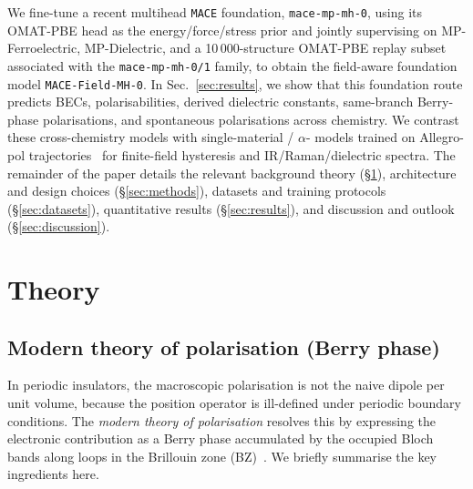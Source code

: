 \documentclass[aps,physrev,graphicx,amsmath,amssymb,
               reprint,superscriptaddress]{revtex4-2}
\begin{document}
We fine-tune a recent multihead \texttt{MACE} foundation, \texttt{mace-mp-mh-0}, using its OMAT-PBE head as the energy/force/stress prior and jointly supervising on MP-Ferroelectric, MP-Dielectric, and a 10\,000-structure OMAT-PBE replay subset associated with the \texttt{mace-mp-mh-0/1} family, to obtain the field-aware foundation model \texttt{MACE-Field-MH-0}. In Sec.~\ref{sec:results}, we show that this foundation route predicts BECs, polarisabilities, derived dielectric constants, same-branch Berry-phase polarisations, and spontaneous polarisations across chemistry. We contrast these cross-chemistry models with single-material  / $\alpha$- models trained on Allegro-pol trajectories~\cite{allegro-pol-2025} for finite-field hysteresis and IR/Raman/dielectric spectra. The remainder of the paper details the relevant background theory (\S\ref{sec:theory}), architecture and design choices (\S\ref{sec:methods}), datasets and training protocols (\S\ref{sec:datasets}), quantitative results (\S\ref{sec:results}), and discussion and outlook (\S\ref{sec:discussion}).


\section{Theory}\label{sec:theory}

\subsection{Modern theory of polarisation (Berry phase)}

In periodic insulators, the macroscopic polarisation is not the naive dipole per unit volume, because the position operator is ill-defined under periodic boundary conditions. The \emph{modern theory of polarisation} resolves this by expressing the electronic contribution as a Berry phase accumulated by the occupied Bloch bands along loops in the Brillouin zone (BZ)~\cite{king-smith-vanderbilt-1993,resta-1994}. We briefly summarise the key ingredients here.
\end{document}
